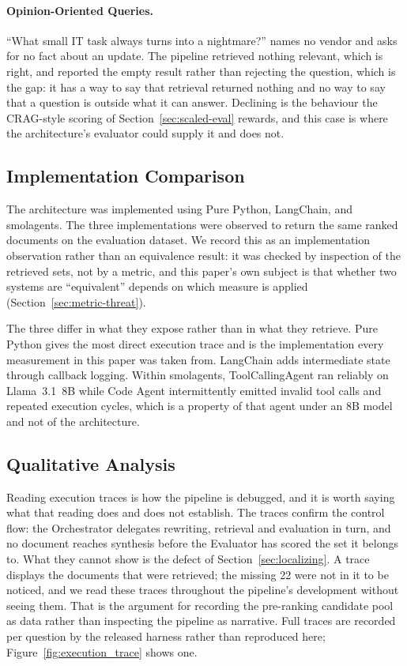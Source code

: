 \documentclass[acmsmall,review,anonymous,screen]{acmart}
\begin{document}
\paragraph{Opinion-Oriented Queries.}
``What small IT task always turns into a nightmare?'' names no vendor and
asks for no fact about an update. The pipeline retrieved nothing relevant, which
is right, and reported the empty result rather than rejecting the question,
which is the gap: it has a way to say that retrieval returned nothing and no way
to say that a question is outside what it can answer. Declining is the behaviour the
CRAG-style scoring of Section~\ref{sec:scaled-eval} rewards, and this case is
where the architecture's evaluator could supply it and does not.

\subsection{Implementation Comparison}

The architecture was implemented using Pure Python, LangChain, and
smolagents. The three implementations were observed to return the same ranked
documents on the evaluation dataset. We record this as an implementation
observation rather than an equivalence result: it was checked by inspection of
the retrieved sets, not by a metric, and this paper's own subject is that
whether two systems are ``equivalent'' depends on which measure is applied
(Section~\ref{sec:metric-threat}).

The three differ in what they expose rather than in what they retrieve. Pure
Python gives the most direct execution trace and is the implementation every
measurement in this paper was taken from. LangChain adds intermediate state
through callback logging. Within smolagents, ToolCallingAgent ran reliably on
Llama~3.1~8B while Code Agent intermittently emitted invalid tool calls and
repeated execution cycles, which is a property of that agent under an 8B model
and not of the architecture.

\subsection{Qualitative Analysis}

Reading execution traces is how the pipeline is debugged, and it is worth
saying what that reading does and does not establish. The traces confirm the
control flow: the Orchestrator delegates rewriting, retrieval and evaluation in
turn, and no document reaches synthesis before the Evaluator has scored the set
it belongs to. What they cannot show is the defect of
Section~\ref{sec:localizing}. A trace displays the documents that were
retrieved; the missing 22 were not in it to be noticed, and we read these traces
throughout the pipeline's development without seeing them. That is the argument for recording the
pre-ranking candidate pool as data rather than inspecting the pipeline as
narrative. Full traces are recorded per question by the released harness rather
than reproduced here; Figure~\ref{fig:execution_trace} shows one.
\end{document}
